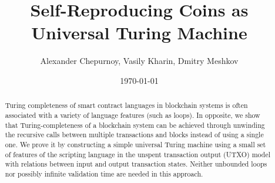 \documentclass[runningheads]{llncs}
\begin{document}
    \title{Self-Reproducing Coins as Universal Turing Machine}

\author{Alexander Chepurnoy, Vasily Kharin, Dmitry Meshkov}


    \date{\today}
    \maketitle

    \begin{abstract}
        Turing completeness of smart contract languages in blockchain
        systems is often associated with a variety of language features
        (such as loops). 
        In opposite, we show that Turing-completeness of a blockchain system can
        be achieved through unwinding the recursive calls between
        multiple transactions and blocks instead of using a single one. We prove 
        it by constructing a simple universal Turing machine using
        a small set of features of the scripting language in the unspent
        transaction output (UTXO) model with relations between
        input and output transaction states.
        Neither unbounded loops nor possibly infinite validation time are needed in this approach.

    \end{abstract}
\end{document}
